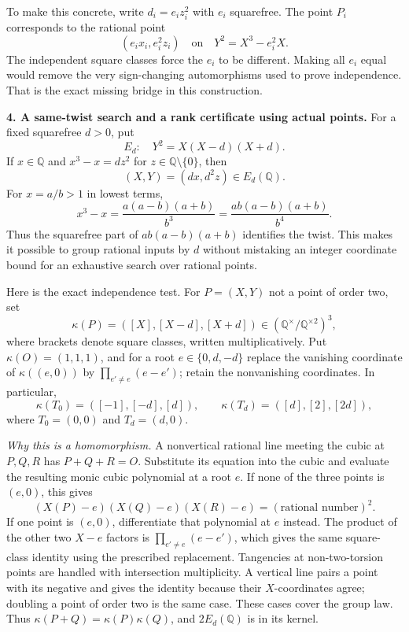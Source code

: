 \documentclass[11pt,a4paper]{article}
\newcommand{\Q}{\mathbb{Q}}
\numberwithin{equation}{section}
\begin{document}
To make this concrete, write $d_i=e_i z_i^2$ with $e_i$ squarefree.
The point $P_i$ corresponds to the rational point
\[
 (e_ix_i,e_i^2z_i)\quad\text{on}\quad
 Y^2=X^3-e_i^2X.
\]
The independent square classes force the $e_i$ to be different. Making all
$e_i$ equal would remove the very sign-changing automorphisms used to prove
independence. That is the exact missing bridge in this construction.

\medskip
\textbf{4. A same-twist search and a rank certificate using actual points.}
For a fixed squarefree $d>0$, put
\[
 E_d:\quad Y^2=X(X-d)(X+d).
\]
If $x\in\Q$ and $x^3-x=dz^2$ for $z\in\Q\setminus\{0\}$, then
\begin{equation}\label{107:point}
 (X,Y)=(dx,d^2z)\in E_d(\Q).
\end{equation}
For $x=a/b>1$ in lowest terms,
\[
 x^3-x=\frac{a(a-b)(a+b)}{b^3}
       =\frac{ab(a-b)(a+b)}{b^4}.
\]
Thus the squarefree part of $ab(a-b)(a+b)$ identifies the twist. This makes
it possible to group rational inputs by $d$ without mistaking an integer
coordinate bound for an exhaustive search over rational points.

Here is the exact independence test. For $P=(X,Y)$ not a point of order two,
set
\[
 \kappa(P)=([X],[X-d],[X+d])
 \in(\Q^\times/\Q^{\times2})^3,
\]
where brackets denote square classes, written multiplicatively. Put
$\kappa(O)=(1,1,1)$, and for a root $e\in\{0,d,-d\}$ replace the vanishing
coordinate of $\kappa((e,0))$ by
$\prod_{e'\neq e}(e-e')$; retain the nonvanishing coordinates. In particular,
\begin{equation}\label{107:torsion}
 \kappa(T_0)=([-1],[-d],[d]),\qquad
 \kappa(T_d)=([d],[2],[2d]),
\end{equation}
where $T_0=(0,0)$ and $T_d=(d,0)$.

\emph{Why this is a homomorphism.} A nonvertical rational line meeting the
cubic at $P,Q,R$ has $P+Q+R=O$. Substitute its equation into the cubic and
evaluate the resulting monic cubic polynomial at a root $e$. If none of
the three points is $(e,0)$, this gives
\[
 (X(P)-e)(X(Q)-e)(X(R)-e)=(\text{rational number})^2.
\]
If one point is $(e,0)$, differentiate that polynomial at $e$ instead. The
product of the other two $X-e$ factors is
$\prod_{e'\neq e}(e-e')$, which gives the same square-class identity using
the prescribed replacement. Tangencies at non-two-torsion points are handled
with intersection multiplicity. A vertical line pairs a point with its
negative and gives the identity because their $X$-coordinates agree; doubling
a point of order two is the same case. These cases cover the group law.
Thus $\kappa(P+Q)=\kappa(P)\kappa(Q)$, and $2E_d(\Q)$ is in its kernel.
\end{document}
